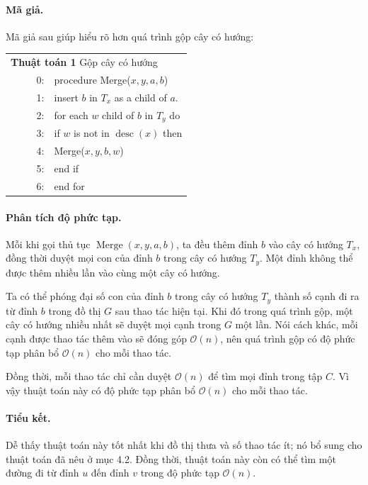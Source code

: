 \documentclass[11pt]{article}
\newcommand{\Oh}{\mathcal{O}}
\begin{document}
\paragraph{Mã giả.}
Mã giả sau giúp hiểu rõ hơn quá trình gộp cây có hướng:
\begin{center}
\small
\begin{tabular}{r@{\quad}p{0.76\linewidth}}
\multicolumn{2}{l}{\textbf{Thuật toán 1} Gộp cây có hướng}\\
0: & procedure Merge(\(x,y,a,b\))\\
1: & \quad insert \(b\) in \(T_x\) as a child of \(a\).\\
2: & \quad for each \(w\) child of \(b\) in \(T_y\) do\\
3: & \qquad if \(w\) is not in \(\operatorname{desc}(x)\) then\\
4: & \qquad\quad Merge(\(x,y,b,w\))\\
5: & \qquad end if\\
6: & \quad end for
\end{tabular}
\end{center}

\paragraph{Phân tích độ phức tạp.}
Mỗi khi gọi thủ tục \(\operatorname{Merge}(x,y,a,b)\), ta đều thêm đỉnh \(b\)
vào cây có hướng \(T_x\), đồng thời duyệt mọi con của đỉnh \(b\) trong cây có
hướng \(T_y\). Một đỉnh không thể được thêm nhiều lần vào cùng một cây có
hướng.

Ta có thể phóng đại số con của đỉnh \(b\) trong cây có hướng \(T_y\) thành số
cạnh đi ra từ đỉnh \(b\) trong đồ thị \(G\) sau thao tác hiện tại. Khi đó trong
quá trình gộp, một cây có hướng nhiều nhất sẽ duyệt mọi cạnh trong \(G\) một
lần. Nói cách khác, mỗi cạnh được thao tác thêm vào sẽ đóng góp \(\Oh(n)\), nên
quá trình gộp có độ phức tạp phân bổ \(\Oh(n)\) cho mỗi thao tác.

Đồng thời, mỗi thao tác chỉ cần duyệt \(\Oh(n)\) để tìm mọi đỉnh trong tập
\(C\). Vì vậy thuật toán này có độ phức tạp phân bổ \(\Oh(n)\) cho mỗi thao
tác.

\paragraph{Tiểu kết.}
Dễ thấy thuật toán này tốt nhất khi đồ thị thưa và số thao tác ít; nó bổ sung
cho thuật toán đã nêu ở mục 4.2. Đồng thời, thuật toán này còn có thể tìm một
đường đi từ đỉnh \(u\) đến đỉnh \(v\) trong độ phức tạp \(\Oh(n)\).
\end{document}
